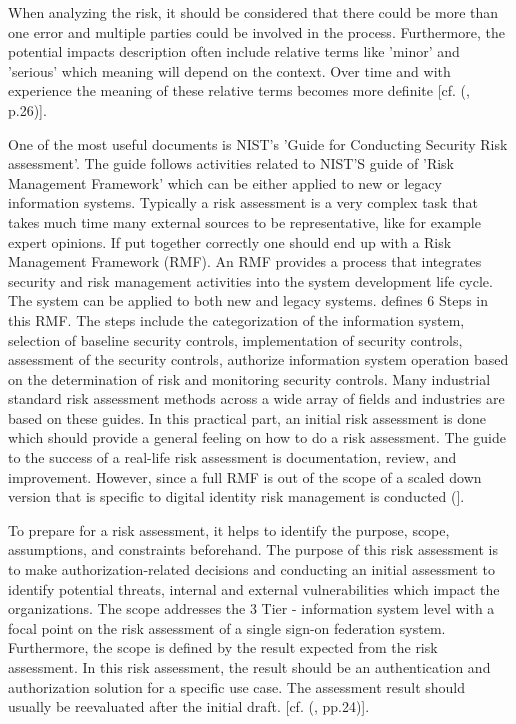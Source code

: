 When analyzing the risk, it should be considered that there could be more than one error and multiple parties could be involved in the process. Furthermore, the potential impacts description often include relative terms like 'minor' and 'serious' which meaning will depend on the context. Over time and with experience the meaning of these relative terms becomes more definite [cf. (\cite{NIST:2017:DIG}, p.26)].

One of the most useful documents is NIST's 'Guide for Conducting Security Risk assessment'. The guide follows activities related to NIST'S guide of 'Risk Management Framework' which can be either applied to new or legacy information systems. Typically a risk assessment is a very complex task that takes much time many external sources to be representative, like for example expert opinions. If put together correctly one should end up with a Risk Management Framework (RMF). An RMF provides a process that integrates security and risk management activities into the system development life cycle. The system can be applied to both new and legacy systems. \cite{NIST:2018:RMF} defines 6 Steps in this RMF. The steps include the categorization of the information system, selection of baseline security controls, implementation of security controls, assessment of the security controls, authorize information system operation based on the determination of risk and monitoring security controls. Many industrial standard risk assessment methods across a wide array of fields and industries are based on these guides.  In this practical part, an initial risk assessment is done which should provide a general feeling on how to do a risk assessment. The guide to the success of a real-life risk assessment is documentation, review, and improvement.  However, since a full RMF is out of the scope of a scaled down version that is specific to digital identity risk management is conducted  (\cite{NIST:2018:RMF}].


To prepare for a risk assessment, it helps to identify the purpose, scope, assumptions, and constraints beforehand. The purpose of this risk assessment is to make authorization-related decisions and conducting an initial assessment to identify potential threats, internal and external vulnerabilities which impact the organizations. The scope addresses the 3 Tier -  information system level with a focal point on the risk assessment of a single sign-on federation system. Furthermore, the scope is defined by the result expected from the risk assessment. In this risk assessment, the result should be an authentication and authorization solution for a specific use case. The assessment result should usually be reevaluated after the initial draft. [cf. (\cite{NIST:2012:GCRA}, pp.24)].

